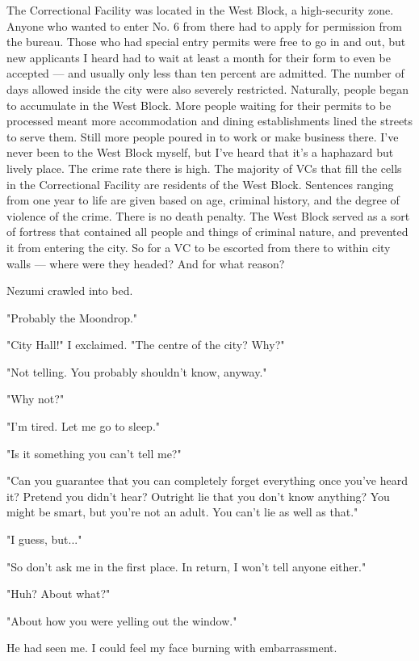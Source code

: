 The Correctional Facility was located in the West Block, a high-security
zone. Anyone who wanted to enter No. 6 from there had to apply for
permission from the bureau. Those who had special entry permits were
free to go in and out, but new applicants I heard had to wait at least a
month for their form to even be accepted --- and usually only less than
ten percent are admitted. The number of days allowed inside the city
were also severely restricted. Naturally, people began to accumulate in
the West Block. More people waiting for their permits to be processed
meant more accommodation and dining establishments lined the streets to
serve them. Still more people poured in to work or make business there.
I've never been to the West Block myself, but I've heard that it's a
haphazard but lively place. The crime rate there is high. The majority
of VCs that fill the cells in the Correctional Facility are residents of
the West Block. Sentences ranging from one year to life are given based
on age, criminal history, and the degree of violence of the crime. There
is no death penalty. The West Block served as a sort of fortress that
contained all people and things of criminal nature, and prevented it
from entering the city. So for a VC to be escorted from there to within
city walls --- where were they headed? And for what reason?

Nezumi crawled into bed.

"Probably the Moondrop."

"City Hall!" I exclaimed. "The centre of the city? Why?"

"Not telling. You probably shouldn't know, anyway."

"Why not?"

"I'm tired. Let me go to sleep."

"Is it something you can't tell me?"

"Can you guarantee that you can completely forget everything once you've
heard it? Pretend you didn't hear? Outright lie that you don't know
anything? You might be smart, but you're not an adult. You can't lie as
well as that."

"I guess, but..."

"So don't ask me in the first place. In return, I won't tell anyone
either."

"Huh? About what?"

"About how you were yelling out the window."

He had seen me. I could feel my face burning with embarrassment.

